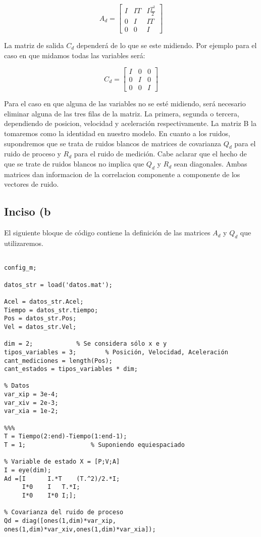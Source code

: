 		\begin{equation*}
			A_{d} = \begin{bmatrix} I & IT & I\frac{T^2}{2} \\[0.3em] 0 & I & IT \\[0.3em] 0 & 0 & I \end{bmatrix}
		\end{equation*}

	La matriz de salida $C_{d}$ dependerá de lo que se este midiendo. Por ejemplo para el caso en que midamos todas las variables será:
	
		\begin{equation*}
			C_{d} = \begin{bmatrix} I & 0 & 0 \\[0.3em] 0 & I & 0 \\[0.3em] 0 & 0 & I \end{bmatrix}
		\end{equation*}
		
	Para el caso en que alguna de las variables no se esté midiendo, será necesario eliminar alguna de las tres filas de la matriz. La primera, segunda o tercera, dependiendo de posicion, velocidad y aceleración respectivamente. La matriz B la tomaremos como la identidad en nuestro modelo.
	En cuanto a los ruidos, supondremos que se trata de ruidos blancos de matrices de covarianza $Q_{d}$ para el ruido de proceso y $R_{d}$ para el ruido de medición. Cabe aclarar que el hecho de que se trate de ruidos blancos no implica que $Q_{d}$ y $R_{d}$ sean diagonales. Ambas matrices dan informacion de la correlacion componente a componente de los vectores de ruido.
	
\subsection{Inciso (b}

	El siguiente bloque de código contiene la definición de las matrices $A_{d}$ y $Q_{d}$ que utilizaremos.

	\begin{lstlisting}
	
config_m;

datos_str = load('datos.mat');

Acel = datos_str.Acel;
Tiempo = datos_str.tiempo;
Pos = datos_str.Pos;
Vel = datos_str.Vel;

dim = 2;			% Se considera sólo x e y
tipos_variables = 3;		% Posición, Velocidad, Aceleración
cant_mediciones = length(Pos);
cant_estados = tipos_variables * dim;

% Datos
var_xip = 3e-4;
var_xiv = 2e-3;
var_xia = 1e-2;

%%%
T = Tiempo(2:end)-Tiempo(1:end-1);	
T = 1;					% Suponiendo equiespaciado

% Variable de estado X = [P;V;A]
I = eye(dim);
Ad =[I		I.*T	(T.^2)/2.*I;
     I*0	I	T.*I;
     I*0	I*0	I;];

% Covarianza del ruido de proceso
Qd = diag([ones(1,dim)*var_xip, ones(1,dim)*var_xiv,ones(1,dim)*var_xia]);

	\end{lstlisting}
	
